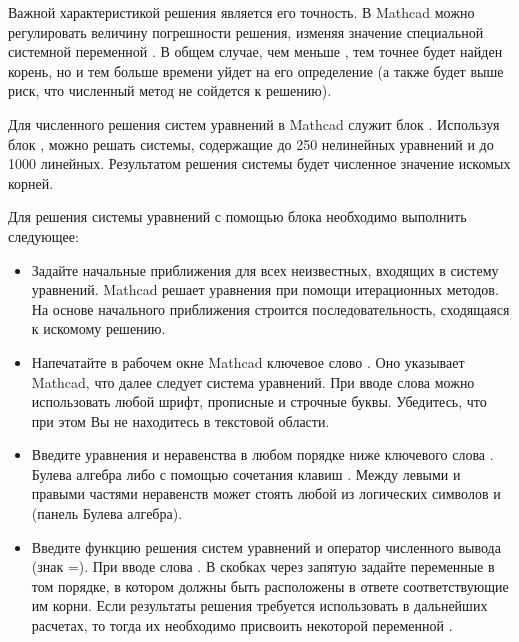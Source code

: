 Важной характеристикой решения является его точность. В Mathcad можно регулировать величину погрешности решения, изменяя значение специальной системной переменной . В общем случае, чем меньше , тем точнее будет найден корень, но и тем больше времени уйдет на его определение (а также будет выше риск, что численный метод не сойдется к решению).


Для численного решения систем уравнений в Mathcad служит блок . Используя блок , можно решать системы, содержащие до 250 нелинейных уравнений и до 1000 линейных. Результатом решения системы будет численное значение искомых корней.

Для решения системы уравнений с помощью блока  необходимо выполнить следующее:
\begin{itemize}
	\item Задайте начальные приближения для всех неизвестных, входящих в систему уравнений. Mathcad решает уравнения при помощи итерационных методов. На основе начального приближения строится последовательность, сходящаяся к искомому решению.
	\item Напечатайте в рабочем окне Mathcad ключевое слово . Оно указывает Mathcad, что далее следует система уравнений. При вводе слова  можно использовать любой шрифт, прописные и строчные буквы. Убедитесь, что при этом Вы не находитесь в текстовой области.
	\item Введите уравнения и неравенства в любом порядке ниже ключевого слова .  Булева алгебра либо с помощью сочетания клавиш \keys{\ctrl+=}. Между левыми и правыми частями неравенств может стоять любой из логических символов и (панель Булева алгебра).
	\item Введите функцию решения систем уравнений и оператор численного вывода (знак =). При вводе слова . В скобках через запятую задайте переменные в том порядке, в котором должны быть расположены в ответе соответствующие им корни. Если результаты решения требуется использовать в дальнейших расчетах, то тогда их необходимо присвоить некоторой переменной .
\end{itemize}



